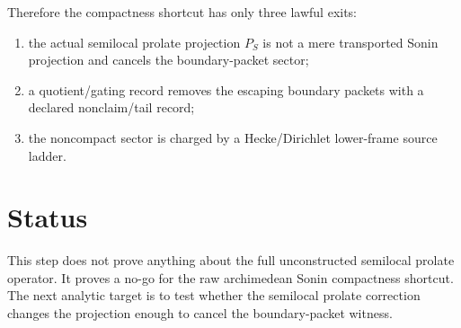 \documentclass[11pt]{article}
\begin{document}
Therefore the compactness shortcut has only three lawful exits:
\begin{enumerate}[label=(\roman*)]
\item the actual semilocal prolate projection $P_S$ is not a mere transported Sonin projection and cancels the boundary-packet sector;
\item a quotient/gating record removes the escaping boundary packets with a declared nonclaim/tail record;
\item the noncompact sector is charged by a Hecke/Dirichlet lower-frame source ladder.
\end{enumerate}

\section{Status}
This step does not prove anything about the full unconstructed semilocal prolate operator. It proves a no-go for the raw archimedean Sonin compactness shortcut. The next analytic target is to test whether the semilocal prolate correction changes the projection enough to cancel the boundary-packet witness.
\end{document}
